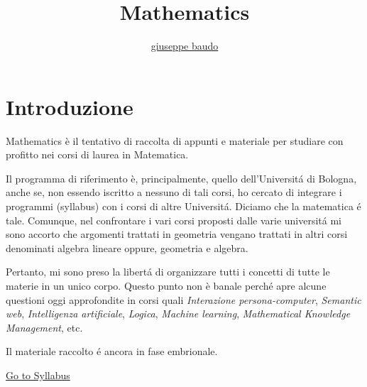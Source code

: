 \documentclass[a4paper,10pt]{article}
\title{Mathematics}
\author{\href{http://www.baudo.hol.es}{giuseppe baudo}}
\begin{document}
	
	\maketitle
	
	\section{Introduzione}		
	Mathematics \`{e} il tentativo di raccolta di appunti e materiale per studiare con profitto nei corsi di laurea in Matematica.
	
	Il programma di riferimento \`{e}, principalmente, quello dell'Universit\'{a}
	di Bologna, anche se, non essendo iscritto a nessuno di tali corsi, ho cercato di integrare i programmi (syllabus) con i corsi di altre Universit\'{a}. Diciamo che la matematica \'{e} tale.
	Comunque, nel confrontare i vari corsi proposti dalle varie universit\'{a} mi sono accorto che argomenti trattati in geometria vengano trattati in altri corsi denominati algebra lineare oppure, geometria e algebra.
	
	Pertanto, mi sono preso la libert\'{a} di organizzare tutti i concetti di tutte le materie in un unico corpo. Questo punto non \`{e} banale perch\'{e} apre alcune questioni oggi
	approfondite in corsi quali \textit{Interazione persona-computer}, \textit{Semantic web}, \textit{Intelligenza artificiale}, \textit{Logica}, \textit{Machine learning}, \textit{Mathematical Knowledge Management}, etc.
	
	Il materiale raccolto \'{e} ancora in fase embrionale. 
	
	
	
	\href{./site/index.html}{Go to Syllabus}
	
\end{document}
